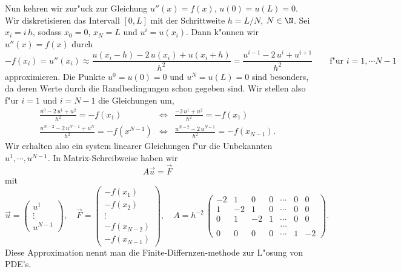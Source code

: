 Nun kehren wir zur"uck zur Gleichung $u''(x) = f(x)$, $u(0)=u(L)=0$. Wir diskretisieren das Intervall $[0,L]$ mit der Schrittweite 
$h=L/N$, $N\in\N$. Sei $x_i= i\, h$, sodass $x_0=0$, $x_N=L$ 
und $u^i=u(x_i)$. 
Dann k"onnen wir $u''(x) = f(x)$ durch
$$ - f(x_i) = u''(x_i) 
 \approx \frac{u(x_i-h)-2\, u(x_i)+u(x_i+h)}{h^2}
= \frac{u^{i-1}-2\, u^i+u^{i+1}}{h^2} \qquad\mbox{f"ur } 
i=1,\cdots N-1
$$
approximieren. Die Punkte $u^0=u(0)=0$ 
und $u^N=u(L)=0$ sind besonders, da
deren Werte durch die Randbedingungen schon gegeben sind. Wir stellen 
also f"ur $i=1$ und $i=N-1$ die Gleichungen um,
\begin{eqnarray*}
\frac{u^{0}-2\, u^1+u^{2}}{h^2} = -f(x_1) &\Leftrightarrow & 
\frac{-2\, u^1+u^{2}}{h^2} = -f(x_1)\\
\frac{u^{N-2}-2\, u^{N-1}+u^{N}}{h^2} = -f(x^{N-1}) &\Leftrightarrow & 
\frac{u^{N-2}-2\, u^{N-1}}{h^2} = -f(x_{N-1}). 
\end{eqnarray*}
Wir erhalten also ein system linearer Gleichungen f"ur die Unbekannten
$u^1,\cdots,u^{N-1}$. In Matrix-Schreibweise haben wir 
$$ A\vec{u} = \vec{F}$$
mit
$$ 
\vec{u} = \left(\begin{array}{c}u^1\\\vdots\\u^{N-1}\end{array}\right),
\quad
\vec{F} = \left(\begin{array}{l}-f(x_1)\\-f(x_2)\\\vdots\\-f(x_{N-2})\\-f(x_{N-1})\end{array}\right),\quad 
A = h^{-2}\,\left(
\begin{array}{ccccccc}
-2 & 1 & 0 & 0 &\cdots & 0 & 0\\
 1 &-2 & 1 & 0 &\cdots & 0 & 0\\
 0 & 1 &-2 & 1 &\cdots & 0 & 0\\
   &   &   &   &\ldots &   &  \\
 0 & 0 & 0 & 0 &\cdots & 1 & -2
 \end{array}\right). 
$$
Diese Approximation nennt man die Finite-Differnzen-methode zur L"osung
von PDE's. 
\par\bigskip

